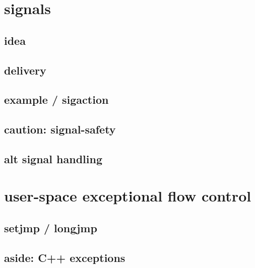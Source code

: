 


\section{signals}

\subsection{idea}



\subsection{delivery}



\subsection{example / sigaction}



\subsection{caution: signal-safety}



\subsection{alt signal handling}



\section{user-space exceptional flow control}
\subsection{setjmp / longjmp}



\subsection{aside: C++ exceptions}


